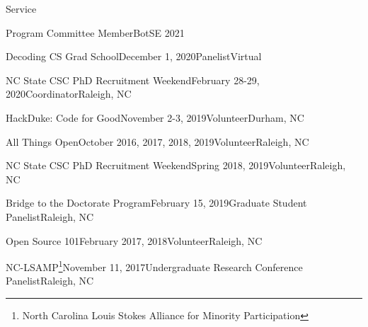 \documentclass{resume} %
\begin{document}
\begin{rSection}{Service}

\begin{sSubsection}{Program Committee Member}{BotSE 2021}{}{}
\end{sSubsection}
\vspace{-5pt}
\begin{sSubsection}{Decoding CS Grad School}{December 1, 2020}{Panelist}{Virtual}
\end{sSubsection}
\vspace{-5pt}
\begin{sSubsection}{NC State CSC PhD Recruitment Weekend}{February 28-29, 2020}{Coordinator}{Raleigh, NC}
\end{sSubsection}
\vspace{-5pt}
\begin{sSubsection}{HackDuke: Code for Good}{November 2-3, 2019}{Volunteer}{Durham, NC}
\end{sSubsection}
\vspace{-5pt}
\begin{sSubsection}{All Things Open}{October 2016, 2017, 2018, 2019}{Volunteer}{Raleigh, NC}
\end{sSubsection}
\vspace{-5pt}
\begin{sSubsection}{NC State CSC PhD Recruitment Weekend}{Spring 2018, 2019}{Volunteer}{Raleigh, NC}
\end{sSubsection}
\vspace{-5pt}
\begin{sSubsection}{Bridge to the Doctorate Program}{February 15, 2019}{Graduate Student Panelist}{Raleigh, NC}
\end{sSubsection}
\vspace{-5pt}
\begin{sSubsection}{Open Source 101}{February 2017, 2018}{Volunteer}{Raleigh, NC}
\end{sSubsection}
\vspace{-5pt}
\begin{sSubsection}{NC-LSAMP\footnote{North Carolina Louis Stokes Alliance for Minority Participation}}{November 11, 2017}{Undergraduate Research Conference Panelist}{Raleigh, NC}

\end{sSubsection}
\end{rSection}
\end{document}
